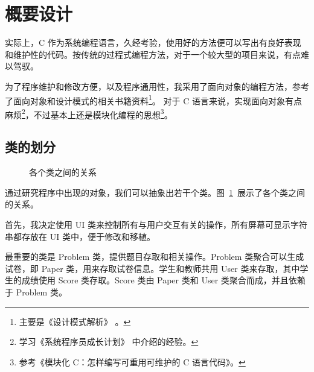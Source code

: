\section{概要设计}

实际上，C 作为系统编程语言，久经考验，使用好的方法便可以写出有良好表现和维护性的代码。按传统的过程式编程方法，对于一个较大型的项目来说，有点难以驾驭。

为了程序维护和修改方便，以及程序通用性，我采用了面向对象的编程方法，参考了面向对象和设计模式的相关书籍资料\footnote{主要是《设计模式解析》\cite{dpatt} \cite{dpatt_c}。}。
对于 C 语言来说，实现面向对象有点麻烦\footnote{学习《系统程序员成长计划》\cite{sys_grow} 中介绍的经验。}，不过基本上还是模块化编程的思想\footnote{参考《模块化 C：怎样编写可重用可维护的 C 语言代码》\cite{modc}。}。

\subsection{类的划分}

\begin{figure}[htp]
  \pictext\small
{}
  \caption{\label{classes}各个类之间的关系}
\end{figure}

通过研究程序中出现的对象，我们可以抽象出若干个类。图~\ref{classes}~展示了各个类之间的关系。

首先，我决定使用 UI 类来控制所有与用户交互有关的操作，所有屏幕可显示字符串都存放在 UI 类中，便于修改和移植。

最重要的类是 Problem 类，提供题目存取和相关操作。Problem 类聚合可以生成试卷，即 Paper 类，用来存取试卷信息。学生和教师共用 User 类来存取，其中学生的成绩使用 Score 类存取。Score 类由 Paper 类和 User 类聚合而成，并且依赖于 Problem 类。

